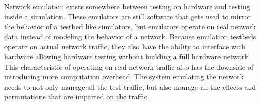Network emulation exists somewhere between testing on hardware and testing inside a simulation.
These emulators are still software that gets used to mirror the behavior of a testbed like simulators, but emulators operate on real network data instead of modeling the behavior of a network.
Because emulation testbeds operate on actual network traffic, they also have the ability to interface with hardware allowing hardware testing without building a full hardware network.
This characteristic of operating on real network traffic also has the downside of introducing more computation overhead.
The system emulating the network needs to not only manage all the test traffic, but also manage all the effects and permutations that are imparted on the traffic. \par

